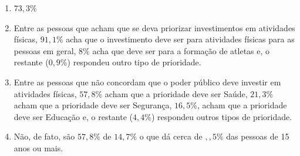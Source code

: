 \documentclass[10 pt,usenames,dvipsnames, oneside]{article}
\begin{document}
\begin{solucao}
\begin{enumerate}
\item $73,3$\%

\item Entre as pessoas que acham que se deva priorizar investimentos em atividades físicas, $91{,}1\%$ acha que o investimento deve ser para atividades físicas para as pessoas em geral, $8\%$ acha que deve ser para a formação de atletas e, o restante ($0{,}9\%$) respondeu outro tipo de prioridade.

\item Entre as pessoas que não concordam que o poder público deve investir em atividades físicas, $57{,}8$\% acham que a prioridade deve ser Saúde, $21{,}3\%$ acham que a prioridade deve ser Segurança, $16{,}5\%$, acham que a prioridade deve ser Educação e, o restante ($4{,}4\%$) respondeu outros tipos de prioridade.

\item Não, de fato, são $57{,}8\%$ de $14{,}7\%$ o que dá cerca de ${,},5\%$ das pessoas de 15 anos ou mais.

\end{enumerate}
\end{solucao}
\fi
\end{document}
